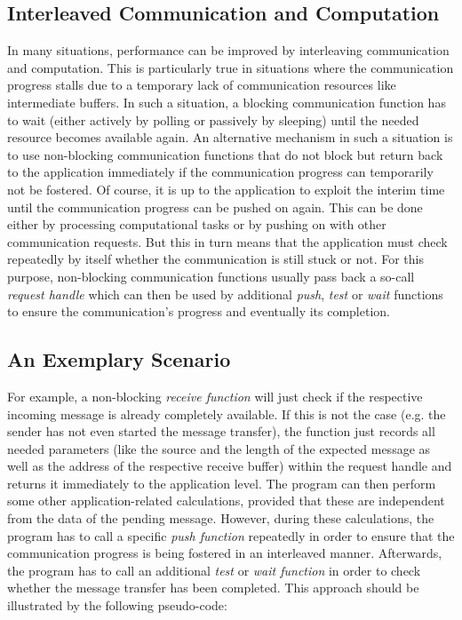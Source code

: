 \documentclass[fontsize=10pt, paper=a4, DIV12, pagesize=auto]{scrartcl}
\begin{document}
\subsection{Interleaved Communication and Computation}

In many situations, performance can be improved by interleaving communication and computation.
This is particularly true in situations where the communication progress stalls due to a temporary lack of communication resources like intermediate buffers.
In such a situation, a blocking communication function has to wait (either actively by polling or passively by sleeping) until the needed resource becomes available again.
An alternative mechanism in such a situation is to use non-blocking communication functions that do not block but return back to the application immediately if the communication progress can temporarily not be fostered.
Of course, it is up to the application to exploit the interim time until the communication progress can be pushed on again. 
This can be done either by processing computational tasks or by pushing on with other communication requests.
But this in turn means that the application must check repeatedly by itself whether the communication is still stuck or not.
For this purpose, non-blocking communication functions usually pass back a so-call \emph{request handle} which can then be used by additional \emph{push}, \emph{test} or \emph{wait} functions to ensure the communication's progress and eventually its completion.


\subsection{An Exemplary Scenario}

For example, a non-blocking \emph{receive function} will just check if the respective incoming message is already completely available.
If this is not the case (e.g. the sender has not even started the message transfer), the function just records all needed parameters (like the source and the length of the expected message as well as the address of the respective receive buffer) within the request handle and returns it immediately to the application level.
The program can then perform some other application-related calculations, provided that these are independent from the data of the pending message.
However, during these calculations, the program has to call a specific \emph{push function} repeatedly in order to ensure that the communication progress is being fostered in an interleaved manner.
Afterwards, the program has to call an additional \emph{test} or \emph{wait function} in order to check whether the message transfer has been completed.
This approach should be illustrated by the following pseudo-code:
\end{document}
